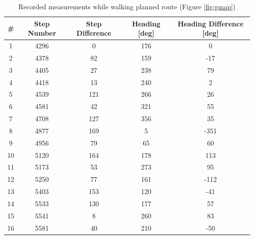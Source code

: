 \documentclass[12pt,letterpaper, onecolumn]{exam}
\begin{document}
\begin{questions}
{        \begin{table}[!h]
            \caption{Recorded measurements while walking planned route (Figure \ref{fig:gmap})}
            \label{tbl:1}
            \centering
            \begin{tabular}{|c|c|c|c|c|}
                \hline
                \# & Step Number & Step Difference & Heading [deg] & Heading Difference [deg] \\ \hline
                1  & 4296        & 0               & 176           & 0                        \\
                2  & 4378        & 82              & 159           & -17                      \\
                3  & 4405        & 27              & 238           & 79                       \\
                4  & 4418        & 13              & 240           & 2                        \\
                5  & 4539        & 121             & 266           & 26                       \\
                6  & 4581        & 42              & 321           & 55                       \\
                7  & 4708        & 127             & 356           & 35                       \\
                8  & 4877        & 169             & 5             & -351                     \\
                9  & 4956        & 79              & 65            & 60                       \\
                10 & 5120        & 164             & 178           & 113                      \\
                11 & 5173        & 53              & 273           & 95                       \\
                12 & 5250        & 77              & 161           & -112                     \\
                13 & 5403        & 153             & 120           & -41                      \\
                14 & 5533        & 130             & 177           & 57                       \\
                15 & 5541        & 8               & 260           & 83                       \\
                16 & 5581        & 40              & 210           & -50                      \\

\end{tabular}
\end{table}}
\end{questions}
\end{document}
